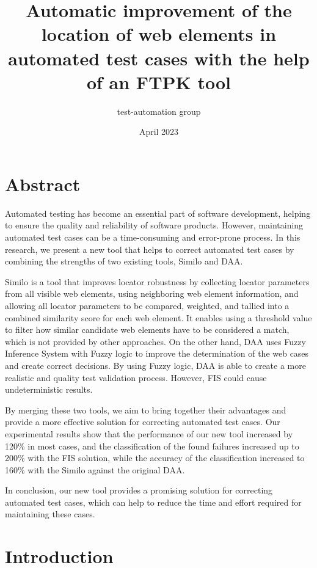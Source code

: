 \documentclass{article}
\title{Automatic improvement of the location of web elements in automated test cases with the help of an FTPK tool}
\author{test-automation group}
\date{April 2023}
\begin{document}
\maketitle

\section{Abstract}

Automated testing has become an essential part of software development, helping to ensure the quality and reliability of software products. However, maintaining automated test cases can be a time-consuming and error-prone process. In this research, we present a new tool that helps to correct automated test cases by combining the strengths of two existing tools, Similo and DAA.

Similo is a tool that improves locator robustness by collecting locator parameters from all visible web elements, using neighboring web element information, and allowing all locator parameters to be compared, weighted, and tallied into a combined similarity score for each web element. It enables using a threshold value to filter how similar candidate web elements have to be considered a match, which is not provided by other approaches. On the other hand, DAA uses Fuzzy Inference System with Fuzzy logic to improve the determination of the web cases and create correct decisions. By using Fuzzy logic, DAA is able to create a more realistic and quality test validation process. However, FIS could cause undeterministic results.

By merging these two tools, we aim to bring together their advantages and provide a more effective solution for correcting automated test cases. Our experimental results show that the performance of our new tool increased by 120\% in most cases, and the classification of the found failures increased up to 200\% with the FIS solution, while the accuracy of the classification increased to 160\% with the Similo against the original DAA.

In conclusion, our new tool provides a promising solution for correcting automated test cases, which can help to reduce the time and effort required for maintaining these cases.

\maketitle

\section{Introduction}
\end{document}

